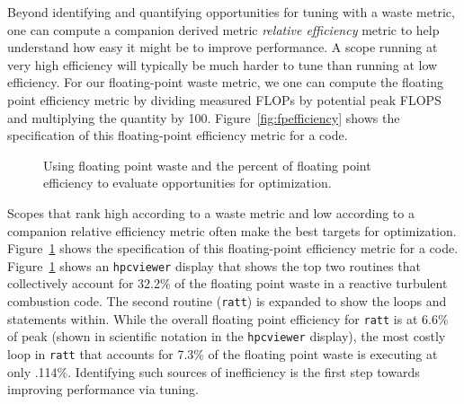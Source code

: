 \documentclass[12pt]{article}
\begin{document}
Beyond identifying and quantifying opportunities for tuning with a waste metric, one can compute a companion 
derived metric {\em relative efficiency} metric to help understand how easy it might be to improve performance. 
A scope running  at very high efficiency will typically be much harder to tune than running at low efficiency.
For our floating-point waste metric, we one can compute the floating point efficiency metric by dividing measured FLOPs by 
potential peak FLOPS and multiplying the quantity by 100. Figure~\ref{fig:fpefficiency} shows the specification of this floating-point efficiency metric for a code.

\begin{figure}[t]
\caption{Using floating point waste and the percent of floating point efficiency to evaluate opportunities for optimization.}
\label{fig:fpefficiency-loop}
\end{figure}

Scopes that rank high according to a waste metric and low according to a companion relative efficiency metric often make the best targets for optimization. Figure~\ref{fig:fpefficiency-loop} shows the specification of this floating-point efficiency metric for a code. Figure~\ref{fig:fpefficiency-loop} shows an {\tt hpcviewer} display that shows the top two routines that collectively account for 32.2\% of the floating point waste in a reactive turbulent combustion code. The second routine ({\tt ratt}) is expanded to show the loops and statements within. While the overall floating point efficiency for {\tt ratt} is at 6.6\% of peak (shown in scientific notation in the {\tt hpcviewer} display), the most costly loop in {\tt ratt} that accounts for 7.3\% of the floating point waste is executing at only .114\%.  Identifying such sources of inefficiency is the first step towards improving performance via tuning.
\end{document}
